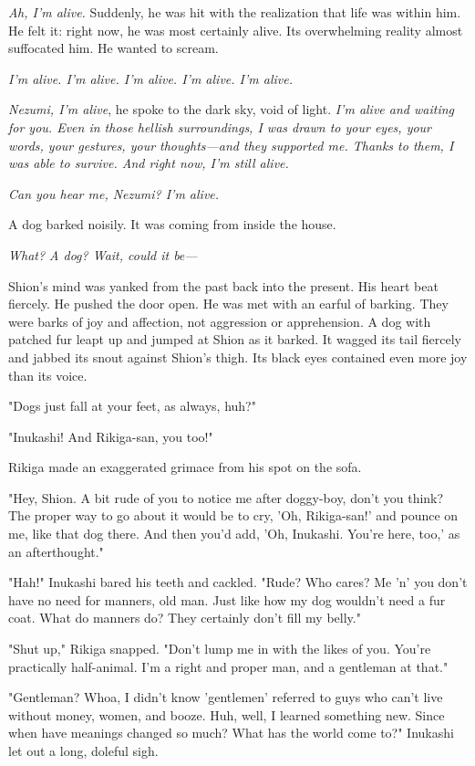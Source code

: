 \emph{Ah, I'm alive.} Suddenly, he was hit with the realization that life was
within him. He felt it: right now, he was most certainly alive. Its
overwhelming reality almost suffocated him. He wanted to scream.

\emph{I'm alive. I'm alive. I'm alive. I'm alive. I'm alive.}

\emph{Nezumi, I'm alive}, he spoke to the dark sky, void of light. \emph{I'm alive
and waiting for you. Even in those hellish surroundings, I was drawn to
your eyes, your words, your gestures, your thoughts---and they supported
me. Thanks to them, I was able to survive. And right now, I'm still
alive.}

\emph{Can you hear me, Nezumi? I'm alive.}

A dog barked noisily. It was coming from inside the house.

\emph{What? A dog? Wait, could it be---}

Shion's mind was yanked from the past back into the present. His heart
beat fiercely. He pushed the door open. He was met with an earful of
barking. They were barks of joy and affection, not aggression or
apprehension. A dog with patched fur leapt up and jumped at Shion as it
barked. It wagged its tail fiercely and jabbed its snout against Shion's
thigh. Its black eyes contained even more joy than its voice.

"Dogs just fall at your feet, as always, huh?"

"Inukashi! And Rikiga-san, you too!"

Rikiga made an exaggerated grimace from his spot on the sofa.

"Hey, Shion. A bit rude of you to notice me after doggy-boy, don't you
think? The proper way to go about it would be to cry,
'Oh, Rikiga-san!' and pounce on me, like that dog there. And then you'd
add, 'Oh, Inukashi. You're here, too,' as an afterthought."

"Hah!" Inukashi bared his teeth and cackled. "Rude? Who cares? Me 'n'
you don't have no need for manners, old man. Just like how my dog
wouldn't need a fur coat. What do manners do? They certainly don't fill
my belly."

"Shut up," Rikiga snapped. "Don't lump me in with the likes of you.
You're practically half-animal. I'm a right and proper man, and a
gentleman at that."

"Gentleman? Whoa, I didn't know 'gentlemen' referred to guys who can't
live without money, women, and booze. Huh, well, I learned something
new. Since when have meanings changed so much? What has the world come
to?" Inukashi let out a long, doleful sigh.

